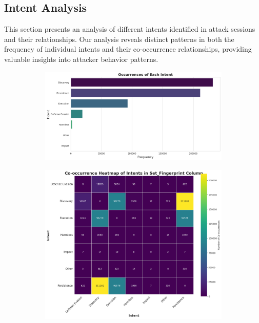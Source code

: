     \subsection{Intent Analysis}
    
        This section presents an analysis of different intents identified in attack sessions and their relationships. Our analysis reveals distinct patterns in both the frequency of individual intents and their co-occurrence relationships, providing valuable insights into attacker behavior patterns.
        
        \begin{figure}[h]
            \centering
            \begin{subfigure}[c]{0.47\textwidth}
                \centering
                \includegraphics[width=\textwidth]{../figures/plots/section1/occurrences_of_each_intent.png}
                \label{fig:occurrences-of-each-intent}
            \end{subfigure}
            \hfill
            \begin{subfigure}[c]{0.47\textwidth}
                \centering
                \includegraphics[width=\textwidth]{../figures/plots/section1/co-occurrence_heatmap_of_intents_in_set_fingerprint_column.png}

\end{subfigure}
\end{figure}
